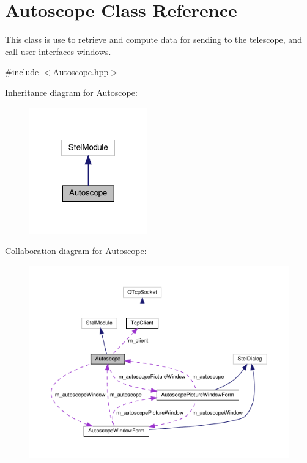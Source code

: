 \hypertarget{class_autoscope}{}\section{Autoscope Class Reference}
\label{class_autoscope}


This class is use to retrieve and compute data for sending to the telescope, and call user interfaces windows.  




{\ttfamily \#include $<$Autoscope.\+hpp$>$}



Inheritance diagram for Autoscope\+:
\nopagebreak
\begin{figure}[H]
\begin{center}
\leavevmode
\includegraphics[width=145pt]{class_autoscope__inherit__graph}
\end{center}
\end{figure}


Collaboration diagram for Autoscope\+:
\nopagebreak
\begin{figure}[H]
\begin{center}
\leavevmode
\includegraphics[width=350pt]{class_autoscope__coll__graph}
\end{center}
\end{figure}
